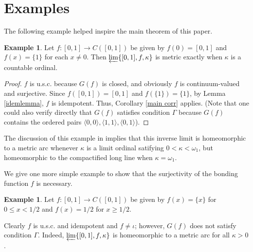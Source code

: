 \documentclass{amsart}
\theoremstyle{definition}
\newtheorem{example}[theorem]{Example}
\newcommand{\<}{\langle}
\renewcommand{\>}{\rangle}
\begin{document}
\section{Examples}

The following example helped inspire the main theorem of this paper.

\begin{example} \label{ex1} Let $f: [0,1] \rightarrow C([0,1])$ be given by $f(0) = [0,1]$ and $f(x) = \{1\}$ for each $x \ne 0$. Then $\varprojlim \{ [0,1], f, \kappa \}$ is metric exactly when $\kappa$ is a countable ordinal.
\end{example}

\begin{proof} $f$ is u.s.c. because $G(f)$ is closed, and obviously $f$ is continuum-valued and surjective. Since $f([0,1]) = [0,1]$ and $f(\{1\}) = \{1\}$, by Lemma \ref{idemlemma}, $f$ is idempotent. Thus, Corollary \ref{main corr} applies. (Note that one could also verify directly that $G(f)$ satisfies condition $\Gamma$ because $G(f)$ contains the ordered pairs $\langle 0,0 \rangle, \langle 1,1 \rangle, \langle 0,1 \rangle$).
\end{proof}

The discussion of this example in \cite{varagona} implies that this inverse limit is homeomorphic to a metric arc whenever $\kappa$ is a limit ordinal satifying $0 < \kappa < \omega_1$, but homeomorphic to the compactified long line when $\kappa = \omega_1$.
\

We give one more simple example to show that the surjectivity of the bonding function $f$ is necessary.

\begin{example} \label{ex2} Let $f: [0,1] \rightarrow C([0,1])$ be given by $f(x) = \{x\}$ for $0 \le x < 1/2$ and $f(x) = 1/2$ for $x \ge 1/2$.
\end{example}

Clearly $f$ is u.s.c. and idempotent and $f \ne \iota$; however, $G(f)$ does not satisfy condition $\Gamma$. Indeed, $\varprojlim \{ [0,1], f, \kappa \}$ is homeomorphic to a metric arc for all $\kappa > 0$.
\end{document}
